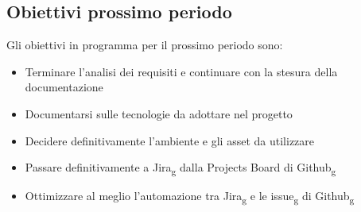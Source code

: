 \subsection{Obiettivi prossimo periodo}
Gli obiettivi in programma per il prossimo periodo sono:
\begin{itemize}
\item Terminare l'analisi dei requisiti e continuare con la stesura della documentazione
\item Documentarsi sulle tecnologie da adottare nel progetto
\item Decidere definitivamente l'ambiente e gli asset da utilizzare
\item Passare definitivamente a Jira\textsubscript{g} dalla Projects Board di Github\textsubscript{g}
\item Ottimizzare al meglio l'automazione tra Jira\textsubscript{g} e le issue\textsubscript{g} di Github\textsubscript{g}
\end{itemize}
